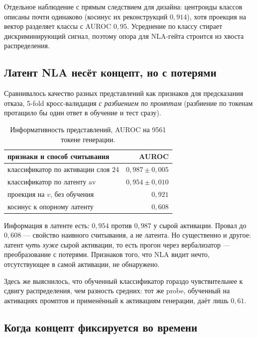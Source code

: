 \documentclass[11pt,a4paper]{article}
\begin{document}
Отдельное наблюдение с прямым следствием для дизайна: центроиды классов описаны
почти одинаково (косинус их реконструкций $0{,}914$), хотя проекция на вектор
разделяет классы с AUROC $0{,}95$. Усреднение по классу стирает
дискриминирующий сигнал, поэтому опора для NLA-гейта строится из хвоста
распределения.

\subsection{Латент NLA несёт концепт, но с потерями}
\label{sec:signals}

Сравнивалось качество разных представлений как признаков для предсказания
отказа, 5-fold кросс-валидация \emph{с разбиением по промптам} (разбиение по
токенам протащило бы один ответ в обучение и тест сразу).

\begin{table}[htbp]
\centering
\caption{Информативность представлений, AUROC на 9561 токене генерации.}
\label{tab:probe}
\small
\begin{tabular}{lr}
\toprule
признаки и способ считывания & AUROC \\
\midrule
классификатор по активации слоя 24 & $0{,}987 \pm 0{,}005$ \\
классификатор по латенту $\mathrm{av}$ & $0{,}954 \pm 0{,}010$ \\
проекция на $v$, без обучения & $0{,}921$ \\
косинус к опорному латенту & $0{,}608$ \\
\bottomrule
\end{tabular}
\end{table}

Информация в латенте есть: $0{,}954$ против $0{,}987$ у сырой активации.
Провал до $0{,}608$ --- свойство наивного считывания, а не латента. Но
существенно и другое: латент \emph{чуть хуже} сырой активации, то есть прогон
через вербализатор --- преобразование с потерями. Признаков того, что NLA видит
нечто, отсутствующее в самой активации, не обнаружено.

Здесь же выяснилось, что обученный классификатор гораздо чувствительнее к
сдвигу распределения, чем разность средних: тот же probe, обученный на
активациях промптов и применённый к активациям генерации, даёт лишь $0{,}61$.

\subsection{Когда концепт фиксируется во времени}
\label{sec:timing}
\end{document}
